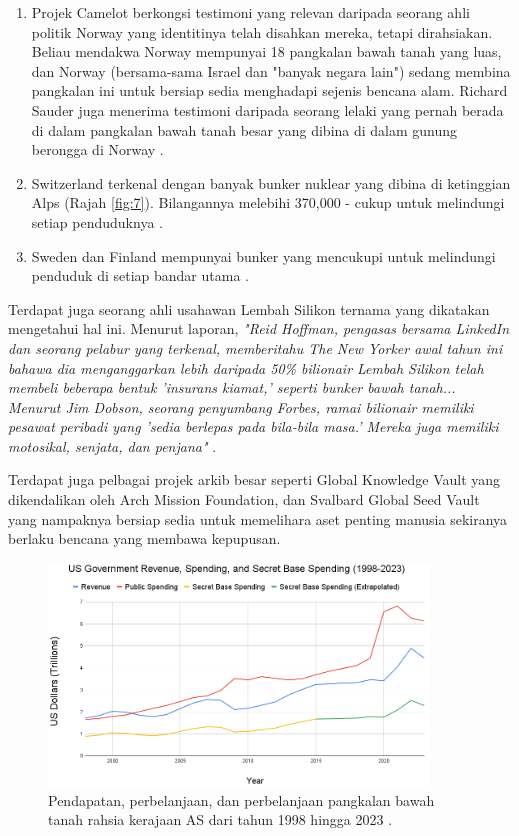 \documentclass[10pt,twocolumn,letterpaper]{article}
\begin{document}
\begin{flushleft}
\begin{enumerate}
    \item Projek Camelot berkongsi testimoni yang relevan daripada seorang ahli politik Norway \cite{25,26} yang identitinya telah disahkan mereka, tetapi dirahsiakan. Beliau mendakwa Norway mempunyai 18 pangkalan bawah tanah yang luas, dan Norway (bersama-sama Israel dan "banyak negara lain") sedang membina pangkalan ini untuk bersiap sedia menghadapi sejenis bencana alam. Richard Sauder juga menerima testimoni daripada seorang lelaki yang pernah berada di dalam pangkalan bawah tanah besar yang dibina di dalam gunung berongga di Norway \cite{22}.
    \item Switzerland terkenal dengan banyak bunker nuklear yang dibina di ketinggian Alps (Rajah \ref{fig:7}). Bilangannya melebihi 370,000 - cukup untuk melindungi setiap penduduknya \cite{27}.
    \item Sweden dan Finland mempunyai bunker yang mencukupi untuk melindungi penduduk di setiap bandar utama \cite{27}. 
\end{enumerate}
\end{flushleft}

Terdapat juga seorang ahli usahawan Lembah Silikon ternama yang dikatakan mengetahui hal ini. Menurut laporan, \textit{"Reid Hoffman, pengasas bersama LinkedIn dan seorang pelabur yang terkenal, memberitahu The New Yorker awal tahun ini bahawa dia menganggarkan lebih daripada 50\% bilionair Lembah Silikon telah membeli beberapa bentuk 'insurans kiamat,' seperti bunker bawah tanah... Menurut Jim Dobson, seorang penyumbang Forbes, ramai bilionair memiliki pesawat peribadi yang 'sedia berlepas pada bila-bila masa.' Mereka juga memiliki motosikal, senjata, dan penjana"} \cite{28}.

Terdapat juga pelbagai projek arkib besar seperti Global Knowledge Vault yang dikendalikan oleh Arch Mission Foundation, \cite{29} dan Svalbard Global Seed Vault \cite{30} yang nampaknya bersiap sedia untuk memelihara aset penting manusia sekiranya berlaku bencana yang membawa kepupusan.
\begin{figure}[t]
\begin{center}
\includegraphics[width=0.9\textwidth]{govcrop2.png}
\end{center}
   \caption{Pendapatan, perbelanjaan, dan perbelanjaan pangkalan bawah tanah rahsia kerajaan AS dari tahun 1998 hingga 2023 \cite{19}.}
   \label{fig:9}
\end{figure}
\end{document}
